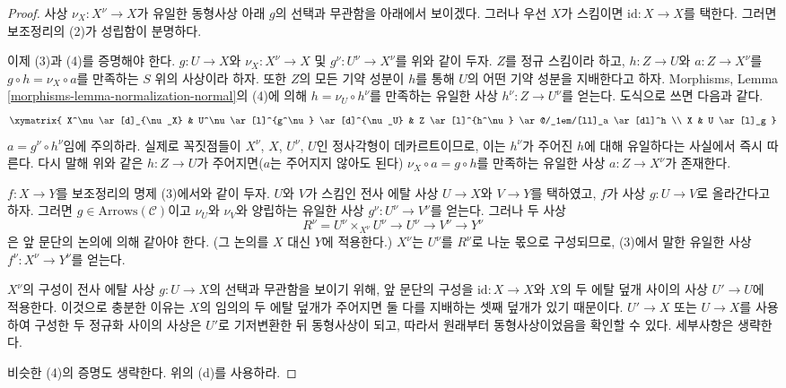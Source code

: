 \begin{proof}
\medskip\noindent
사상 $\nu_X : X^\nu \to X$가 유일한 동형사상 아래 $g$의 선택과
무관함을 아래에서 보이겠다. 그러나 우선 $X$가 스킴이면
$\text{id} : X \to X$를 택한다. 그러면 보조정리의 (2)가 성립함이
분명하다.

\medskip\noindent
이제 (3)과 (4)를 증명해야 한다. $g : U \to X$와
$\nu_X : X^\nu \to X$ 및 $g^\nu : U^\nu \to X^\nu$를 위와 같이 두자.
$Z$를 정규 스킴이라 하고, $h : Z \to U$와 $a : Z \to X^\nu$를
$g \circ h = \nu_X \circ a$를 만족하는 $S$ 위의 사상이라 하자. 또한
$Z$의 모든 기약 성분이 $h$를 통해 $U$의 어떤 기약 성분을 지배한다고
하자. Morphisms, Lemma \ref{morphisms-lemma-normalization-normal}의 (4)에
의해 $h = \nu_U \circ h^\nu$를 만족하는 유일한 사상
$h^\nu : Z \to U^\nu$를 얻는다. 도식으로 쓰면 다음과 같다.
$$
\xymatrix{
X^\nu \ar[d]_{\nu_X} &
U^\nu \ar[l]^{g^\nu} \ar[d]^{\nu_U} &
Z \ar[l]^{h^\nu} \ar@/_1em/[ll]_a \ar[dl]^h
\\
X & U \ar[l]_g
}
$$
$a = g^\nu \circ h^\nu$임에 주의하라. 실제로 꼭짓점들이 $X^\nu$, $X$,
$U^\nu$, $U$인 정사각형이 데카르트이므로, 이는 $h^\nu$가 주어진 $h$에
대해 유일하다는 사실에서 즉시 따른다. 다시 말해 위와 같은
$h : Z \to U$가 주어지면($a$는 주어지지 않아도 된다)
$\nu_X \circ a = g \circ h$를 만족하는 유일한 사상
$a : Z \to X^\nu$가 존재한다.

\medskip\noindent
$f : X \to Y$를 보조정리의 명제 (3)에서와 같이 두자. $U$와 $V$가
스킴인 전사 에탈 사상 $U \to X$와 $V \to Y$를 택하였고, $f$가 사상
$g : U \to V$로 올라간다고 하자. 그러면
$g \in \text{Arrows}(\mathcal{C})$이고 $\nu_U$와 $\nu_V$와 양립하는
유일한 사상 $g^\nu : U^\nu \to V^\nu$를 얻는다. 그러나 두 사상
$$
R^\nu = U^\nu \times_{X^\nu} U^\nu
\to U^\nu \to V^\nu \to Y^\nu
$$
은 앞 문단의 논의에 의해 같아야 한다.
(그 논의를 $X$ 대신 $Y$에 적용한다.) $X^\nu$는 $U^\nu$를 $R^\nu$로
나눈 몫으로 구성되므로, (3)에서 말한 유일한 사상
$f^\nu : X^\nu \to Y^\nu$를 얻는다.

\medskip\noindent
$X^\nu$의 구성이 전사 에탈 사상 $g : U \to X$의 선택과 무관함을
보이기 위해, 앞 문단의 구성을 $\text{id} : X \to X$와 $X$의 두 에탈
덮개 사이의 사상 $U' \to U$에 적용한다. 이것으로 충분한 이유는 $X$의
임의의 두 에탈 덮개가 주어지면 둘 다를 지배하는 셋째 덮개가 있기
때문이다. $U' \to X$ 또는 $U \to X$를 사용하여 구성한 두 정규화 사이의
사상은 $U'$로 기저변환한 뒤 동형사상이 되고, 따라서 원래부터
동형사상이었음을 확인할 수 있다. 세부사항은 생략한다.

\medskip\noindent
비슷한 (4)의 증명도 생략한다. 위의 (d)를 사용하라.
\end{proof}

